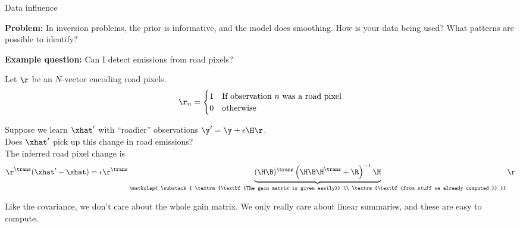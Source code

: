 \documentclass[8pt]{beamer}\usepackage[]{graphicx}\usepackage[]{color}
\begin{document}

\begin{frame}{Data influence}

\textbf{Problem: }In inversion problems, the prior is informative, and the model
does smoothing. How is your data being used?  What patterns are possible to
identify?

\textbf{Example question: }Can I detect emissions from road pixels?

\pause
Let $\r$ be an $N$-vector encoding road pixels.
$$
\r_n = 
\begin{cases}
   1 &\textrm{If observation }n\textrm{ was a road pixel}\\
   0 &\textrm{otherwise}\\
\end{cases}
$$

Suppose we learn $\xhat'$ with ``roadier'' observations $\y' = \y + \epsilon \H \r$.\\
Does $\xhat'$ pick up this change in road emissions?\\[1em]

\pause
The inferred road pixel change is
$$
\r^\trans (\xhat' - \xhat) = 
\epsilon \r^\trans
\underbrace{
   (\H \B)^\trans \left(
         \H \B \H^\trans + \R
      \right)^{-1}
   \H 
}_{
   \mathclap{
   \substack{
      \textrm{\textbf{The gain matrix is given easily}} \\
      \textrm{\textbf{from stuff we already computed.}}
   }}
}
\r
$$

Like the covariance, we don't care about the whole gain matrix.  We
only really care about linear summaries, and these are easy to compute.








\end{frame}
\end{document}
